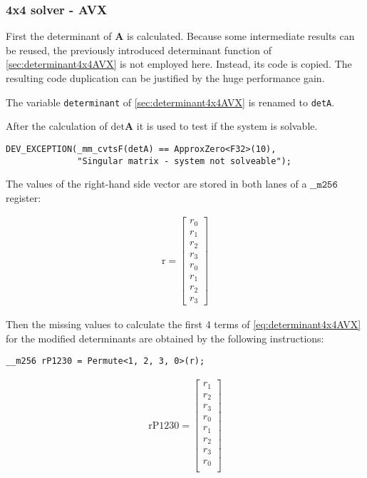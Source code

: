 \newpage
\subsubsection{4x4 solver - AVX}

First the determinant of $\mathbf{A}$ is calculated.
Because some intermediate results can be reused, the previously introduced determinant function of \cref{sec:determinant4x4AVX} is not employed here. 
Instead, its code is copied. 
The resulting code duplication can be justified by the huge performance gain.

The variable \texttt{determinant} of \cref{sec:determinant4x4AVX} is renamed to \texttt{detA}.

After the calculation of $\mathrm{det}\mathbf{A}$ it is used to test if the system is solvable.

\begin{verbatim}
DEV_EXCEPTION(_mm_cvtsF(detA) == ApproxZero<F32>(10), 
              "Singular matrix - system not solveable");
\end{verbatim} 

The values of the right-hand side vector are stored in both lanes of a $\texttt{__m256}$ register:


\begin{align*}
\mathrm{r} 
=
\begin{bmatrix}
r_0\\
r_1\\
r_2\\
r_3\\
r_0\\
r_1\\
r_2\\
r_3
\end{bmatrix}
\end{align*}


Then the missing values to calculate the first 4 terms of \cref{eq:determinant4x4AVX} for the modified determinants are obtained by the following instructions:

\begin{verbatim}
__m256 rP1230 = Permute<1, 2, 3, 0>(r);
\end{verbatim} 

\begin{align*}
\mathrm{rP1230} 
=
\begin{bmatrix}
r_1\\
r_2\\
r_3\\
r_0\\
r_1\\
r_2\\
r_3\\
r_0\\
\end{bmatrix}
\end{align*}

